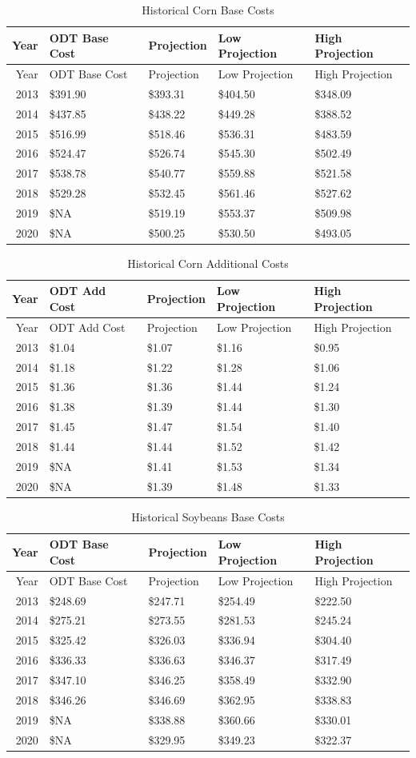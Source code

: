 \documentclass[]{article}
\begin{document}
\newpage

\begin{longtable}[]{@{}rllll@{}}
\caption{Historical Corn Base Costs}\tabularnewline
\toprule
Year & ODT Base Cost & Projection & Low Projection & High
Projection\tabularnewline
\midrule
\endfirsthead
\toprule
Year & ODT Base Cost & Projection & Low Projection & High
Projection\tabularnewline
\midrule
\endhead
2013 & \$391.90 & \$393.31 & \$404.50 & \$348.09\tabularnewline
2014 & \$437.85 & \$438.22 & \$449.28 & \$388.52\tabularnewline
2015 & \$516.99 & \$518.46 & \$536.31 & \$483.59\tabularnewline
2016 & \$524.47 & \$526.74 & \$545.30 & \$502.49\tabularnewline
2017 & \$538.78 & \$540.77 & \$559.88 & \$521.58\tabularnewline
2018 & \$529.28 & \$532.45 & \$561.46 & \$527.62\tabularnewline
2019 & \$NA & \$519.19 & \$553.37 & \$509.98\tabularnewline
2020 & \$NA & \$500.25 & \$530.50 & \$493.05\tabularnewline
\bottomrule
\end{longtable}

\begin{longtable}[]{@{}rllll@{}}
\caption{Historical Corn Additional Costs}\tabularnewline
\toprule
Year & ODT Add Cost & Projection & Low Projection & High
Projection\tabularnewline
\midrule
\endfirsthead
\toprule
Year & ODT Add Cost & Projection & Low Projection & High
Projection\tabularnewline
\midrule
\endhead
2013 & \$1.04 & \$1.07 & \$1.16 & \$0.95\tabularnewline
2014 & \$1.18 & \$1.22 & \$1.28 & \$1.06\tabularnewline
2015 & \$1.36 & \$1.36 & \$1.44 & \$1.24\tabularnewline
2016 & \$1.38 & \$1.39 & \$1.44 & \$1.30\tabularnewline
2017 & \$1.45 & \$1.47 & \$1.54 & \$1.40\tabularnewline
2018 & \$1.44 & \$1.44 & \$1.52 & \$1.42\tabularnewline
2019 & \$NA & \$1.41 & \$1.53 & \$1.34\tabularnewline
2020 & \$NA & \$1.39 & \$1.48 & \$1.33\tabularnewline
\bottomrule
\end{longtable}

\newpage

\begin{longtable}[]{@{}rllll@{}}
\caption{Historical Soybeans Base Costs}\tabularnewline
\toprule
Year & ODT Base Cost & Projection & Low Projection & High
Projection\tabularnewline
\midrule
\endfirsthead
\toprule
Year & ODT Base Cost & Projection & Low Projection & High
Projection\tabularnewline
\midrule
\endhead
2013 & \$248.69 & \$247.71 & \$254.49 & \$222.50\tabularnewline
2014 & \$275.21 & \$273.55 & \$281.53 & \$245.24\tabularnewline
2015 & \$325.42 & \$326.03 & \$336.94 & \$304.40\tabularnewline
2016 & \$336.33 & \$336.63 & \$346.37 & \$317.49\tabularnewline
2017 & \$347.10 & \$346.25 & \$358.49 & \$332.90\tabularnewline
2018 & \$346.26 & \$346.69 & \$362.95 & \$338.83\tabularnewline
2019 & \$NA & \$338.88 & \$360.66 & \$330.01\tabularnewline
2020 & \$NA & \$329.95 & \$349.23 & \$322.37\tabularnewline
\bottomrule
\end{longtable}
\end{document}
